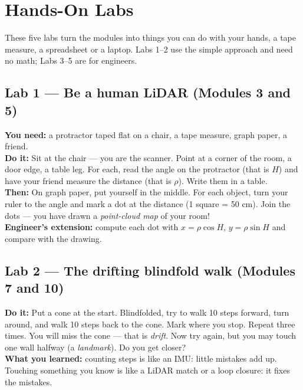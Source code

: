 \chapter{Hands-On Labs}
These five labs turn the modules into things you can do with your hands, a tape measure, a spreadsheet or a laptop. Labs 1--2 use the simple approach and need no math; Labs 3--5 are for engineers.

\section*{Lab 1 --- Be a human LiDAR (Modules 3 and 5)}
\begin{kid}
\textbf{You need:} a protractor taped flat on a chair, a tape measure, graph paper, a friend.\\
\textbf{Do it:} Sit at the chair --- you are the scanner. Point at a corner of the room, a door edge, a table leg. For each, read the angle on the protractor (that is $H$) and have your friend measure the distance (that is $\rho$). Write them in a table.\\
\textbf{Then:} On graph paper, put yourself in the middle. For each object, turn your ruler to the angle and mark a dot at the distance (1 square = 50 cm). Join the dots --- you have drawn a \emph{point-cloud map} of your room!\\
\textbf{Engineer's extension:} compute each dot with $x=\rho\cos H$, $y=\rho\sin H$ and compare with the drawing.
\end{kid}

\section*{Lab 2 --- The drifting blindfold walk (Modules 7 and 10)}
\begin{kid}
\textbf{Do it:} Put a cone at the start. Blindfolded, try to walk 10 steps forward, turn around, and walk 10 steps back to the cone. Mark where you stop. Repeat three times. You will miss the cone --- that is \emph{drift}. Now try again, but you may touch one wall halfway (a \emph{landmark}). Do you get closer?\\
\textbf{What you learned:} counting steps is like an IMU: little mistakes add up. Touching something you know is like a LiDAR match or a loop closure: it fixes the mistakes.
\end{kid}

